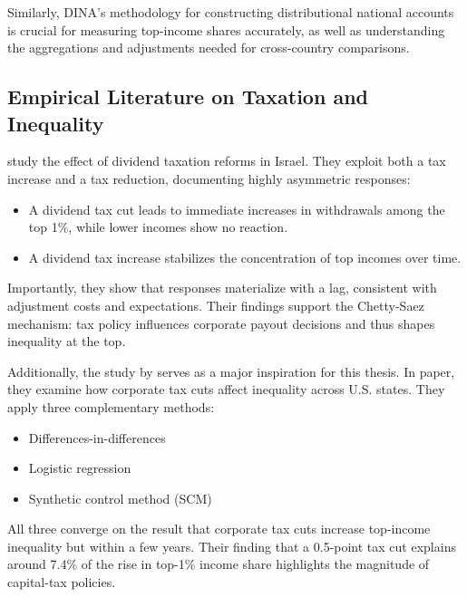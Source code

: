 \documentclass[11pt,a4paper]{article}
\begin{document}
Similarly, \cite{piketty_distributional_nodate} DINA's methodology for constructing distributional national accounts is crucial for measuring top-income shares accurately, as well as understanding the aggregations and adjustments needed for cross-country comparisons.

\subsection{Empirical Literature on Taxation and Inequality}

\par
\cite{berman2024capital} study the effect of dividend taxation reforms in Israel. 
They exploit both a tax increase and a tax reduction, documenting highly asymmetric responses:

\begin{itemize}[leftmargin= 2cm]
    \item A dividend tax cut leads to immediate increases in withdrawals among the top 1\%, while lower incomes show no reaction.
    \item A dividend tax increase stabilizes the concentration of top incomes over time.
\end{itemize}

\par
Importantly, they show that responses materialize with a lag, consistent with adjustment costs and expectations. 
Their findings support the Chetty-Saez mechanism: tax policy influences corporate payout decisions and thus shapes inequality at the top.

\par
Additionally, the study by \cite{nallareddy2021corporate} serves as a major inspiration for this thesis.
In paper, they examine how corporate tax cuts affect inequality across U.S. states. 
They apply three complementary methods:

\begin{itemize}[leftmargin= 2cm]
    \item Differences-in-differences
    \item Logistic regression
    \item Synthetic control method (SCM)
\end{itemize}

\par
All three converge on the result that corporate tax cuts increase top-income inequality but within a few years. 
Their finding that a 0.5-point tax cut explains around 7.4\% of the rise in top-1\% income share highlights the magnitude of capital-tax policies.
\end{document}
